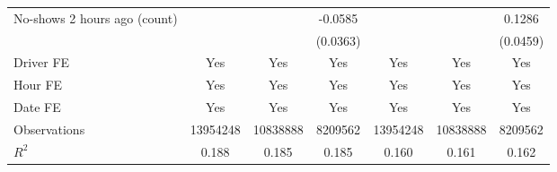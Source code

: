 {\begin{tabular}{l*{6}{S}}
\addlinespace
No-shows 2 hours ago (count)&                     &                     &     -0.0585         &                     &                     &      0.1286\sym{***}\\
                    &                     &                     &    (0.0363)         &                     &                     &    (0.0459)         \\
\addlinespace
Driver FE           &       {Yes}         &       {Yes}         &       {Yes}         &       {Yes}         &       {Yes}         &       {Yes}         \\
\addlinespace
Hour FE             &       {Yes}         &       {Yes}         &       {Yes}         &       {Yes}         &       {Yes}         &       {Yes}         \\
\addlinespace
Date FE             &       {Yes}         &       {Yes}         &       {Yes}         &       {Yes}         &       {Yes}         &       {Yes}         \\
\midrule
Observations        &\num{13954248}         &\num{10838888}         &\num{8209562}         &\num{13954248}         &\num{10838888}         &\num{8209562}         \\
$R^2$             &     {0.188}         &     {0.185}         &     {0.185}         &     {0.160}         &     {0.161}         &     {0.162}         \\
\bottomrule
\end{tabular}
}
